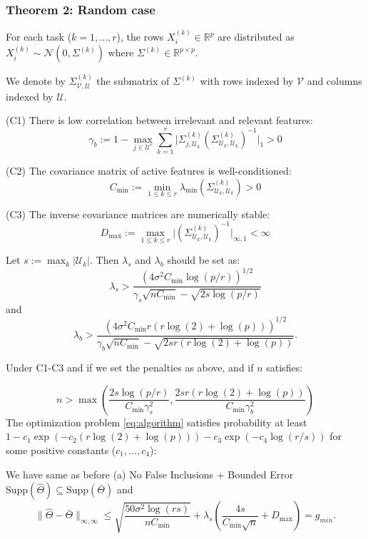 \documentclass{article}
\begin{document}
\subsubsection{Theorem 2: Random case}
For each task ($k = 1, \dots, r$), the rows $X^{(k)}_i \in \mathbb{R}^p$ are distributed as $X_i^{(k)} \sim \mathcal{N}(0,\Sigma^{(k)})$ where $\Sigma^{(k)} \in \mathbb{R}^{p \times p}$.

We denote by $\Sigma^{(k)}_{\mathcal{V},\mathcal{U}}$ the submatrix of $\Sigma^{(k)}$ with rows indexed by $\mathcal{V}$ and columns indexed by $\mathcal{U}$.

(C1) There is low correlation between irrelevant and relevant features:
$$\gamma_b := 1 - \max_{j \in \mathcal{U}^c} \sum_{k=1}^r
\Big| \Sigma^{(k)}_{j, \mathcal{U}_k} (\Sigma^{(k)}_{\mathcal{U}_k, \mathcal{U}_k})^{-1} \Big|_1 > 0$$

(C2) The covariance matrix of active features is well-conditioned:
$$C_{\min} := \min_{1 \le k \le r} \lambda_{\min}(\Sigma^{(k)}_{\mathcal{U}_k, \mathcal{U}_k}) > 0$$

(C3) The inverse covariance matrices are numerically stable:
$$D_{\max} := \max_{1 \le k \le r} \Big| (\Sigma^{(k)}_{\mathcal{U}_k, \mathcal{U}_k})^{-1} \Big|_{\infty,1} < \infty$$

Let $s := \max_k |\mathcal{U}_k|$.
Then $\lambda_s$ and $\lambda_b$ should be set as:
\begin{equation*}
\lambda_s > \frac{(4\sigma^2 C_{\min} \log(p/r))^{1/2}}{\gamma_s \sqrt{n C_{\min}} - \sqrt{2s \log(p/r)}}
\end{equation*}
and
\begin{equation*}
\lambda_b > \frac{(4\sigma^2 C_{\min} r(r \log(2) + \log(p)))^{1/2}}{\gamma_b \sqrt{n C_{\min}} - \sqrt{2sr(r \log(2) + \log(p))}}.
\end{equation*}

Under C1-C3 and if we set the penalties as above, and if $n$ satisfies:

\begin{equation*}
n > \max\left(\frac{2s \log(p/r)}{C_{\min} \gamma_s^2}, \frac{2sr(r \log(2) + \log(p))}{C_{\min} \gamma_b^2}\right)
\end{equation*}
The optimization problem \eqref{eq:algorithm} satisfies probability at least $1 - c_1 \exp\left(-c_2 (r \log(2) + \log(p))\right) - c_3 \exp(-c_4 \log(r/s))$
for some positive constants ($c_1, \dots, c_4$):

We have same as before
(a) No False Inclusions + Bounded Error
$\text{Supp}(\widehat{\Theta}) \subseteq \text{Supp}(\bar{\Theta})$
and
\begin{equation*}
\|\widehat{\Theta} - \bar{\Theta}\|_{\infty, \infty} \le
\sqrt{\frac{50 \sigma^2 \log(rs)}{n C_{\min}}} +
\lambda_s \left( \frac{4 s}{C_{\min} \sqrt{n}} + D_{\max} \right) = g_{min}.
\end{equation*}
\end{document}

